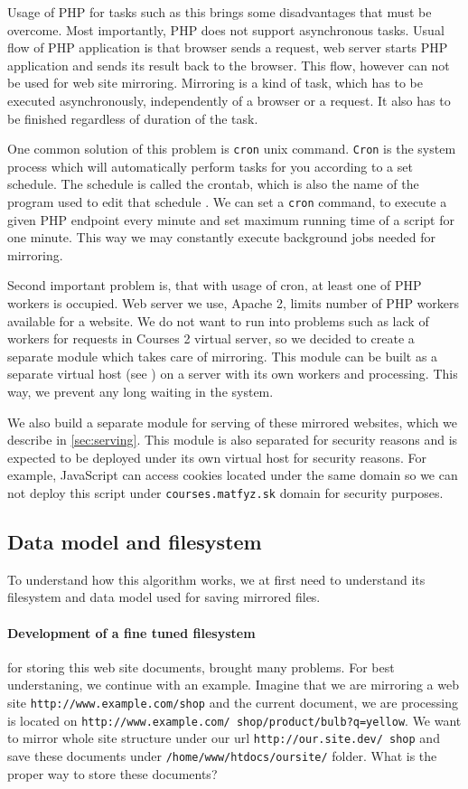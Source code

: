 Usage of PHP for tasks such as this brings some disadvantages that must be overcome. Most importantly, PHP does not support asynchronous tasks. Usual flow of PHP application is that browser sends a request, web server starts PHP application and sends its result back to the browser. This flow, however can not be used for web site mirroring. Mirroring is a kind of task, which has to be executed asynchronously, independently of a browser or a request. It also has to be finished regardless of duration of the task.

One common solution of this problem is \texttt{cron} unix command. \texttt{Cron} is the system process which will automatically perform tasks for you according to a set schedule. The schedule is called the crontab, which is also the name of the program used to edit that schedule \cite{crontab}. We can set a \texttt{cron} command, to execute a given PHP endpoint every minute and set maximum running time of a script for one minute. This way we may constantly execute background jobs needed for mirroring.

Second important problem is, that with usage of cron, at least one of PHP workers is occupied. Web server we use, Apache 2, limits number of PHP workers available for a website. We do not want to run into problems such as lack of workers for requests in Courses 2 virtual server, so we decided to create a separate module which takes care of mirroring. This module can be built as a separate virtual host (see \cite{apachepocket}) on a server with its own workers and processing. This way, we prevent any long waiting in the system.

We also build a separate module for serving of these mirrored websites, which we describe in \ref{sec:serving}. This module is also separated for security reasons and is expected to be deployed under its own virtual host for security reasons. For example, JavaScript can access cookies located under the same domain so we can not deploy this script under \texttt{courses.matfyz.sk} domain for security purposes.

\subsection{Data model and filesystem}
\label{sec:filesystem}
To understand how this algorithm works, we at first need to understand its filesystem and data model used for saving mirrored files. 

\paragraph{Development of a fine tuned filesystem} for storing this web site documents, brought many problems. For best understaning, we continue with an example. Imagine that we are mirroring a web site \texttt{http://www.example.com/shop} and the current document, we are processing is located on \texttt{http://www.example.com/ shop/product/bulb?q=yellow}. We want to mirror whole site structure under our url \texttt{http://our.site.dev/ shop} and save these documents under \texttt{/home/www/htdocs/oursite/} folder. What is the proper way to store these documents?

